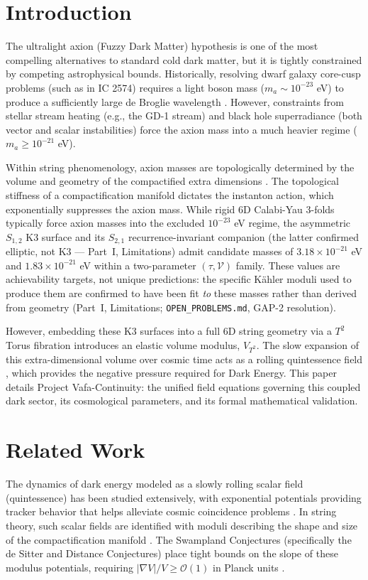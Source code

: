 \documentclass[12pt]{article}
\begin{document}
\section{Introduction}
The ultralight axion (Fuzzy Dark Matter) hypothesis is one of the most compelling alternatives to standard cold dark matter, but it is tightly constrained by competing astrophysical bounds. Historically, resolving dwarf galaxy core-cusp problems (such as in IC 2574) requires a light boson mass ($m_a \sim 10^{-23}$ eV) to produce a sufficiently large de Broglie wavelength \cite{schive2014}. However, constraints from stellar stream heating (e.g., the GD-1 stream) \cite{bonaca2019high} and black hole superradiance (both vector and scalar instabilities) \cite{detweiler1980klein, dolan2007, arvanitaki2010string, arvanitaki2017} force the axion mass into a much heavier regime ($m_a \ge 10^{-21}$ eV). 

Within string phenomenology, axion masses are topologically determined by the volume and geometry of the compactified extra dimensions \cite{svrcek2006axions}. The topological stiffness of a compactification manifold dictates the instanton action, which exponentially suppresses the axion mass. While rigid 6D Calabi-Yau 3-folds typically force axion masses into the excluded $10^{-23}$ eV regime, the asymmetric $S_{1,2}$ K3 surface and its $S_{2,1}$ recurrence-invariant companion (the latter confirmed elliptic, not K3 — Part~I, Limitations) admit candidate masses of $3.18 \times 10^{-21}$ eV and $1.83 \times 10^{-21}$ eV within a two-parameter $(\tau,\mathcal{V})$ family. These values are achievability targets, not unique predictions: the specific K\"ahler moduli used to produce them are confirmed to have been fit \emph{to} these masses rather than derived from geometry (Part~I, Limitations; \texttt{OPEN\_PROBLEMS.md}, GAP-2 resolution).

However, embedding these K3 surfaces into a full 6D string geometry via a $T^2$ Torus fibration introduces an elastic volume modulus, $V_{T^2}$. The slow expansion of this extra-dimensional volume over cosmic time acts as a rolling quintessence field \cite{copeland2006}, which provides the negative pressure required for Dark Energy. This paper details Project Vafa-Continuity: the unified field equations governing this coupled dark sector, its cosmological parameters, and its formal mathematical validation.

\section{Related Work}
The dynamics of dark energy modeled as a slowly rolling scalar field (quintessence) has been studied extensively, with exponential potentials providing tracker behavior that helps alleviate cosmic coincidence problems \cite{copeland2006}. In string theory, such scalar fields are identified with moduli describing the shape and size of the compactification manifold \cite{conlon2006}. The Swampland Conjectures (specifically the de Sitter and Distance Conjectures) place tight bounds on the slope of these modulus potentials, requiring $|\nabla V|/V \ge \mathcal{O}(1)$ in Planck units \cite{obied2018dS, ooguri2019refined}.
\end{document}
